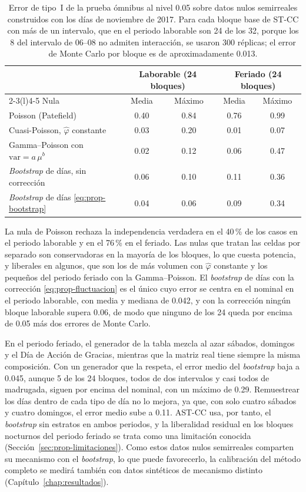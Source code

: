 \begin{table}[t]
\centering
\small
\begin{tabular}{@{}lcccc@{}}
\toprule
 & \multicolumn{2}{c}{Laborable (24 bloques)} & \multicolumn{2}{c}{Feriado (24 bloques)} \\
\cmidrule(lr){2-3}\cmidrule(l){4-5}
Nula & Media & Máximo & Media & Máximo \\
\midrule
Poisson (Patefield) \citep{Patefield1981} & 0.40 & 0.84 & 0.76 & 0.99 \\
Cuasi-Poisson, $\hat\varphi$ constante & 0.03 & 0.20 & 0.01 & 0.07 \\
Gamma--Poisson con $\mathrm{var} = a\,\mu^b$ & 0.02 & 0.12 & 0.06 & 0.47 \\
\emph{Bootstrap} de días, sin corrección & 0.06 & 0.10 & 0.11 & 0.36 \\
\emph{Bootstrap} de días \eqref{eq:prop-bootstrap} & 0.04 & 0.06 & 0.09 & 0.34 \\
\bottomrule
\end{tabular}
\caption{Error de tipo~I de la prueba ómnibus al nivel 0.05 sobre datos nulos
semirreales construidos con los días de noviembre de 2017. Para cada bloque base
de ST-CC con más de un intervalo, que en el periodo laborable son 24 de los 32,
porque los 8 del intervalo de 06--08 no admiten interacción, se usaron 300 réplicas; el error de Monte Carlo por bloque es de
aproximadamente 0.013.}
\label{tab:prop-calibracion}
\end{table}

La nula de Poisson rechaza la independencia verdadera en el 40\,\% de los casos
en el periodo laborable y en el 76\,\% en el feriado. Las nulas que tratan las
celdas por separado son conservadoras en la mayoría de los bloques, lo que cuesta
potencia, y liberales en algunos, que son los de más volumen con $\hat\varphi$
constante y los pequeños del periodo feriado con la Gamma--Poisson. El
\emph{bootstrap} de días con la corrección \eqref{eq:prop-fluctuacion} es el único
cuyo error se centra en el nominal en el periodo laborable, con media y mediana
de 0.042, y con la corrección ningún bloque laborable supera 0.06, de modo que
ninguno de los 24 queda por encima de 0.05 más dos errores de Monte Carlo.

En el periodo feriado, el generador de la tabla mezcla al azar sábados, domingos
y el Día de Acción de Gracias, mientras que la matriz real tiene siempre la
misma composición. Con un generador que la respeta, el error medio del \emph{bootstrap}
baja a 0.045, aunque 5 de los 24 bloques, todos de dos intervalos y casi todos
de madrugada, siguen por encima del nominal, con un máximo de 0.29. Remuestrear
los días dentro de cada tipo de día no lo mejora, ya que, con solo cuatro sábados
y cuatro domingos, el error medio sube a 0.11. AST-CC usa, por tanto, el \emph{bootstrap} sin
estratos en ambos periodos, y la liberalidad residual en los bloques nocturnos
del periodo feriado se trata como una limitación conocida
(Sección~\ref{sec:prop-limitaciones}). Como estos datos nulos semirreales
comparten su mecanismo con el \emph{bootstrap}, lo que puede favorecerlo, la
calibración del método completo se medirá también con datos sintéticos de
mecanismo distinto (Capítulo~\ref{chap:resultados}).

